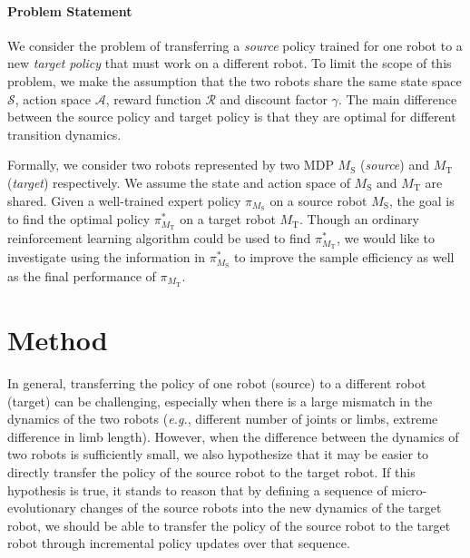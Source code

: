 \documentclass[nohyperref]{article}
\theoremstyle{plain}
\theoremstyle{definition}
\theoremstyle{remark}
\begin{document}
\paragraph{Problem Statement}
We consider the problem of transferring a \emph{source} policy trained for one robot to a new \emph{target policy} that must work on a different robot. 
To limit the scope of this problem, we make the assumption that the two robots share the same state space $\mathcal{S}$, action space $\mathcal{A}$, reward function $\mathcal{R}$ and discount factor $\gamma$. 
The main difference between the source policy and target policy is that they are optimal for different transition dynamics. 



Formally, we consider two robots represented by two MDP $M_{\text{S}}$ (\emph{source}) and $M_{\text{T}}$ (\emph{target}) respectively.
We assume the state and action space of $M_{\text{S}}$ and $M_{\text{T}}$ are shared. Given a well-trained expert policy $\pi_{M_{\text{S}}}$ on a source robot $M_{\text{S}}$, the goal is to find the optimal policy $\pi_{M_{\text{T}}}^*$ on a target robot $M_{\text{T}}$.
Though an ordinary reinforcement learning algorithm could be used to find $\pi_{M_{\text{T}}}^*$, we would like to investigate using the information in $\pi_{M_{\text{S}}}^*$ to improve the sample efficiency as well as the final performance of $\pi_{M_{\text{T}}}$.



\section{Method}

In general, transferring the policy of one robot (source) to a different robot (target) can be challenging, especially when there is a large mismatch in the dynamics of the two robots (\emph{e.g.}, different number of joints or limbs, extreme difference in limb length). However, when the difference between the dynamics of two robots is sufficiently small, we also hypothesize that it may be easier to directly transfer the policy of the source robot to the target robot. If this hypothesis is true, it stands to reason that by defining a sequence of micro-evolutionary changes of the source robots into the new dynamics of the target robot, we should be able to transfer the policy of the source robot to the target robot through incremental policy updates over that sequence. 
\end{document}
